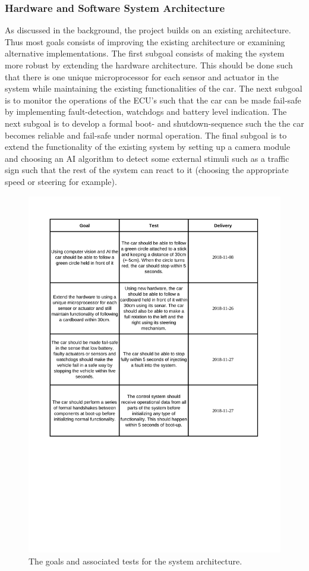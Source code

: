 \documentclass[11pt, titlepage]{article} %
\begin{document}
\subsubsection{Hardware and Software System Architecture}
As discussed in the background, the project builds on an existing
architecture. Thus most goals consists of improving the existing
architecture or examining alternative implementations. The first subgoal
consists of making the system more robust by extending the hardware
architecture. This should be done such that there is one unique
microprocessor for each sensor and actuator in the system while maintaining
the existing functionalities of the car. The next subgoal is to monitor the
operations of the ECU’s such that the car can be made fail-safe by
implementing fault-detection, watchdogs and battery level indication.
The next subgoal is to develop a formal boot- and shutdown-sequence such
the the car becomes reliable and fail-safe under normal operation. The
final subgoal is to extend the functionality of the existing system by
setting up a camera module and choosing an AI algorithm to detect some
external stimuli such as a traffic sign such that the rest of the system
can react to it (choosing the appropriate speed or steering for example). 
\begin{figure}
    \centering
    \includegraphics[scale=0.6]{goals_arch.pdf}
    \caption{The goals and associated tests for the system architecture.}
    \label{fig:goals_arch}
\end{figure}
\end{document}
